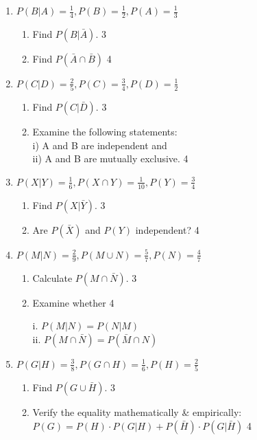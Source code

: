 \documentclass[a4paper,oneside, margin=1.4in]{book}
\begin{document}
\begin{enumerate}
  \item \textbf{\( P(B \vert A) = \frac{1}{4}, P(B) = \frac{1}{2}, P(A) = \frac{1}{3} \)}

\begin{enumerate}
    \item Find \( P(B \vert \bar{A}) \). \hfill 3
    \item Find $P(\bar A \cap \bar B)$ \hfill 4
\end{enumerate}

\item \textbf{\( P(C \vert D) = \frac{2}{5}, P(C) = \frac{3}{4}, P(D) = \frac{1}{2} \)}

\begin{enumerate}
    \item Find \( P(C \vert \bar{D}) \). \hfill 3
    \item Examine the following statements: \\ i) A and B are independent and \\
    ii) A and B are mutually exclusive. \hfill 4
\end{enumerate}

\item \textbf{\( P(X \vert Y) = \frac{1}{6}, P(X \cap Y) = \frac{1}{10}, P(Y) = \frac{3}{4} \)}

\begin{enumerate}
    \item Find \( P(X \vert \bar{Y}) \). \hfill 3
    \item Are $P(\bar X)$ and $P(Y)$ independent? \hfill 4
\end{enumerate}

\item \textbf{\( P(M \vert N) = \frac{2}{9}, P(M \cup N) = \frac{5}{7}, P(N) = \frac{4}{7} \)}

\begin{enumerate}
    \item Calculate \( P(M \cap \bar{N}) \). \hfill 3
    \item Examine whether   \hfill 4
    
    i. $P(M \vert N) = P(N \vert M)$ \\
    ii. $P(M \cap \bar N) = P(\bar M \cap N)$

\end{enumerate}

\item \textbf{\( P(G \vert H) = \frac{3}{8}, P(G \cap H) = \frac{1}{6}, P(H) = \frac{2}{5} \)}

\begin{enumerate}
    \item Find \( P(G \cup \bar{H}) \). \hfill 3
	\item Verify the equality mathematically \& empirically: \\ $P(G) = P(H) \cdot P(G \vert H) + P(\bar H) \cdot P(G \vert \bar H)$ \hfill 4
\end{enumerate}


\end{enumerate}
\end{document}

